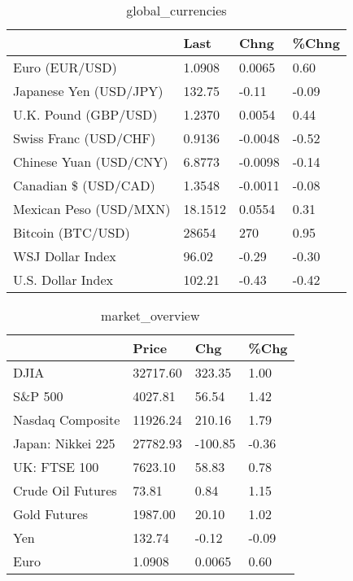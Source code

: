 \documentclass{article}%
\begin{document}
%


\begin{table}[htbp]%
\caption{global\_currencies}%
\centering%
\begin{adjustbox}{width=1\textwidth}%
\begin{tabular}{llll}
\toprule
                       &    Last &    Chng & \%Chng \\
\midrule
        Euro (EUR/USD) &  1.0908 &  0.0065 &  0.60 \\
Japanese Yen (USD/JPY) &  132.75 &   -0.11 & -0.09 \\
  U.K. Pound (GBP/USD) &  1.2370 &  0.0054 &  0.44 \\
 Swiss Franc (USD/CHF) &  0.9136 & -0.0048 & -0.52 \\
Chinese Yuan (USD/CNY) &  6.8773 & -0.0098 & -0.14 \\
  Canadian \$ (USD/CAD) &  1.3548 & -0.0011 & -0.08 \\
Mexican Peso (USD/MXN) & 18.1512 &  0.0554 &  0.31 \\
     Bitcoin (BTC/USD) &   28654 &     270 &  0.95 \\
      WSJ Dollar Index &   96.02 &   -0.29 & -0.30 \\
     U.S. Dollar Index &  102.21 &   -0.43 & -0.42 \\
\bottomrule
\end{tabular}
%
\end{adjustbox}%
\end{table}

%


\begin{table}[htbp]%
\caption{market\_overview}%
\centering%
\begin{adjustbox}{width=1\textwidth}%
\begin{tabular}{llll}
\toprule
                  &    Price &     Chg &  \%Chg \\
\midrule
             DJIA & 32717.60 &  323.35 &  1.00 \\
          S\&P 500 &  4027.81 &   56.54 &  1.42 \\
 Nasdaq Composite & 11926.24 &  210.16 &  1.79 \\
Japan: Nikkei 225 & 27782.93 & -100.85 & -0.36 \\
     UK: FTSE 100 &  7623.10 &   58.83 &  0.78 \\
Crude Oil Futures &    73.81 &    0.84 &  1.15 \\
     Gold Futures &  1987.00 &   20.10 &  1.02 \\
              Yen &   132.74 &   -0.12 & -0.09 \\
             Euro &   1.0908 &  0.0065 &  0.60 \\
\bottomrule
\end{tabular}
%
\end{adjustbox}%
\end{table}

%
\end{document}
